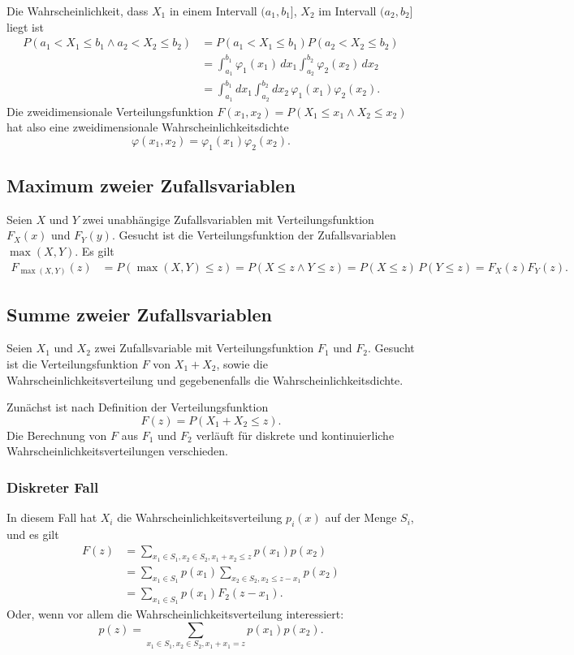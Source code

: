 Die Wahrscheinlichkeit, dass $X_1$ in einem Intervall $(a_1,b_1]$,
$X_2$ im Intervall $(a_2,b_2]$ liegt ist 
\begin{align*}
P(a_1<X_1\le b_1\wedge a_2<X_2\le b_2)
&= P(a_1<X_1\le b_1) P(a_2<X_2\le b_2)\\
&=\int_{a_1}^{b_1}\varphi_1(x_1)\,dx_1
\int_{a_2}^{b_2}\varphi_2(x_2)\,dx_2\\
&=\int_{a_1}^{b_1}dx_1
\int_{a_2}^{b_2}dx_2\,
\varphi_1(x_1) \varphi_2(x_2).
\end{align*}
Die zweidimensionale
Verteilungsfunktion $F(x_1,x_2)=P(X_1\le x_1\wedge X_2\le x_2)$ hat
also eine zweidimensionale Wahrscheinlichkeitsdichte
\[
\varphi(x_1,x_2)=\varphi_1(x_1)\varphi_2(x_2).
\]

\subsection{Maximum zweier Zufallsvariablen}
Seien $X$ und $Y$ zwei unabhängige Zufallsvariablen mit Verteilungsfunktion
$F_X(x)$ und $F_Y(y)$.
Gesucht ist die Verteilungsfunktion der Zufallsvariablen
$\max(X,Y)$.
Es gilt
\begin{align*}
F_{\max(X,Y)}(z)
&=
P(\max(X,Y)\le z)
=
P(X\le z\wedge Y\le z)
=
P(X\le z)\,P(Y\le z)
=
F_X(z)F_Y(z).
\end{align*}

\subsection{Summe zweier Zufallsvariablen}
Seien $X_1$ und $X_2$ zwei Zufallsvariable mit Verteilungsfunktion $F_1$ und
$F_2$.
Gesucht ist die Verteilungsfunktion $F$ von $X_1+X_2$, sowie die
Wahrscheinlichkeitsverteilung und gegebenenfalls die Wahrscheinlichkeitsdichte.

Zunächst ist nach Definition der Verteilungsfunktion
\[
F(z)=P(X_1+X_2\le z).
\]
Die Berechnung von $F$ aus $F_1$ und $F_2$ verläuft für diskrete und
kontinuierliche Wahrscheinlichkeitsverteilungen verschieden.
\subsubsection{Diskreter Fall}
In diesem Fall hat $X_i$ die Wahrscheinlichkeitsverteilung
$p_i(x)$ auf der Menge $S_i$, und es gilt
\begin{align*}
F(z)&=\sum_{x_1\in S_1, x_2\in S_2, x_1+x_2\le z}p(x_1)p(x_2)\\
&=\sum_{x_1\in S_1}p(x_1)\sum_{x_2\in S_2, x_2 \le z - x_1}p(x_2)\\
&=\sum_{x_1\in S_1}p(x_1) F_2(z-x_1).
\end{align*}
Oder, wenn vor allem die Wahrscheinlichkeitsverteilung interessiert:
\[
p(z)=\sum_{x_1\in S_1, x_2\in S_2, x_1+x_1=z}p(x_1)p(x_2).
\]
